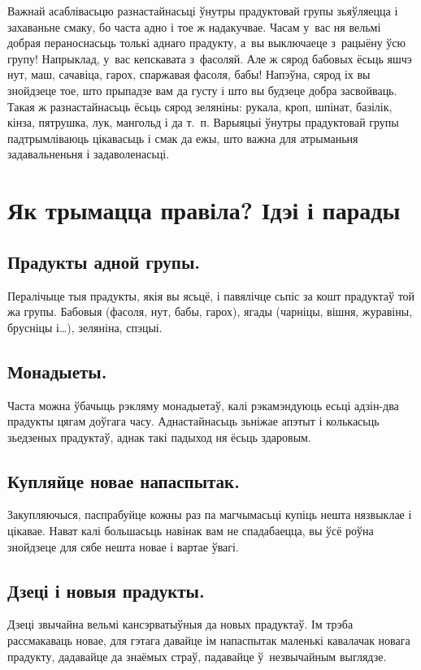 Важнай асаблівасьцю разнастайнасьці ўнутры прадуктовай групы зьяўляецца і захаваньне смаку, бо часта адно і тое ж надакучвае. Часам у~вас ня вельмі добрая пераноснасьць толькі аднаго прадукту, а~вы выключаеце з~рацыёну ўсю групу! Напрыклад, у~вас кепскавата з~фасоляй. Але ж сярод бабовых ёсьць яшчэ нут, маш, сачавіца, гарох, спаржавая фасоля, бабы! Напэўна, сярод іх вы знойдзеце тое, што прыпадзе вам да густу і што вы будзеце добра засвойваць. Такая ж разнастайнасьць ёсьць сярод зеляніны: рукала, кроп, шпінат, базілік, кінза, пятрушка, лук, мангольд і да т.~п. Варыяцыі ўнутры прадуктовай групы падтрымліваюць цікавасьць і смак да ежы, што важна для атрыманьня задавальненьня і задаволенасьці.

\section{Як трымацца правіла? Ідэі і парады}

\subsection{Прадукты адной групы.}
Пералічыце тыя прадукты, якія вы ясьцё, і павялічце сьпіс за кошт прадуктаў той жа групы. Бабовыя (фасоля, нут, бабы, гарох), ягады (чарніцы, вішня, журавіны, брусніцы і…), зеляніна, спэцыі.

\subsection{Монадыеты.}
Часта можна ўбачыць рэкляму монадыетаў, калі рэкамэндуюць есьці адзін-два прадукты цягам доўгага часу. Аднастайнасьць зьніжае апэтыт і колькасьць зьедзеных прадуктаў, аднак такі падыход ня ёсьць здаровым.

\subsection{Купляйце новае напаспытак.}
Закупляючыся, паспрабуйце кожны раз па магчымасьці купіць нешта нязвыклае і цікавае. Нават калі большасьць навінак вам не спадабаецца, вы ўсё роўна знойдзеце для сябе нешта новае і вартае ўвагі.


\subsection{Дзеці і новыя прадукты.}
Дзеці звычайна вельмі кансэрватыўныя да новых прадуктаў. Ім трэба рассмакаваць новае, для гэтага давайце ім напаспытак маленькі кавалачак новага прадукту, дадавайце да знаёмых страў, падавайце ў~незвычайным выглядзе.

